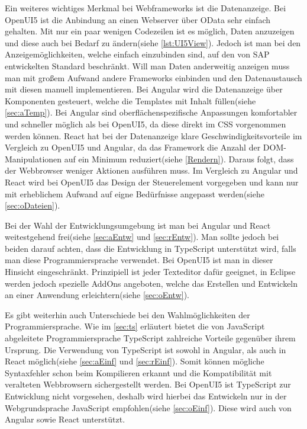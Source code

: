 Ein weiteres wichtiges Merkmal bei Webframeworks ist die Datenanzeige. Bei OpenUI5 ist die Anbindung an einen Webserver über OData sehr einfach gehalten. Mit nur ein paar wenigen Codezeilen ist es möglich, Daten anzuzeigen und diese auch bei Bedarf zu ändern(siehe \autoref{lst:UI5View}). Jedoch ist man bei den Anzeigemöglichkeiten, welche einfach einzubinden sind, auf den von SAP entwickelten Standard beschränkt. Will man Daten anderweitig anzeigen muss man mit großem Aufwand andere Frameworks einbinden und den Datenaustausch mit diesen manuell implementieren. Bei Angular wird die Datenanzeige über Komponenten gesteuert, welche die Templates mit Inhalt füllen(siehe \autoref{sec:aTemp}). Bei Angular sind oberflächenspezifische Anpassungen komfortabler und schneller möglich als bei OpenUI5, da diese direkt im CSS vorgenommen werden können. React hat bei der Datenanzeige klare Geschwindigkeitsvorteile im Vergleich zu OpenUI5 und Angular, da das Framework die Anzahl der DOM-Manipulationen auf ein Minimum reduziert(siehe \autoref{Rendern}). Daraus folgt, dass der Webbrowser weniger Aktionen ausführen muss. Im Vergleich zu Angular und React wird bei OpenUI5 das Design der Steuerelement vorgegeben und kann nur mit erheblichem Aufwand auf eigne Bedürfnisse angepasst werden(siehe \autoref{sec:oDateien}).   

Bei der Wahl der Entwicklungsumgebung ist man bei Angular und React weitestgehend frei(siehe \autoref{sec:aEntw} und \ref{sec:rEntw}). Man sollte jedoch bei beiden darauf achten, dass die Entwicklung in TypeScript unterstützt wird, falls man diese Programmiersprache verwendet. Bei OpenUI5 ist man in dieser Hinsicht eingeschränkt. Prinzipiell ist jeder Texteditor dafür geeignet, in Eclipse werden jedoch spezielle AddOns angeboten, welche das Erstellen und Entwickeln an einer Anwendung erleichtern(siehe \autoref{sec:oEntw}).

Es gibt weiterhin auch Unterschiede bei den Wahlmöglichkeiten der Programmiersprache. Wie im \autoref{sec:ts} erläutert bietet die von JavaScript abgeleitete Programmiersprache TypeScript zahlreiche Vorteile gegenüber ihrem Ursprung. Die Verwendung von TypeScript ist sowohl in Angular, als auch in React möglich(siehe \autoref{sec:aEinf} und \ref{sec:rEinf}). Somit können mögliche Syntaxfehler schon beim Kompilieren erkannt und die Kompatibilität mit veralteten Webbrowsern sichergestellt werden. Bei OpenUI5 ist TypeScript zur Entwicklung nicht vorgesehen, deshalb wird hierbei das Entwickeln nur in der Webgrundsprache JavaScript empfohlen(siehe \autoref{sec:oEinf}). Diese wird auch von Angular sowie React unterstützt.

